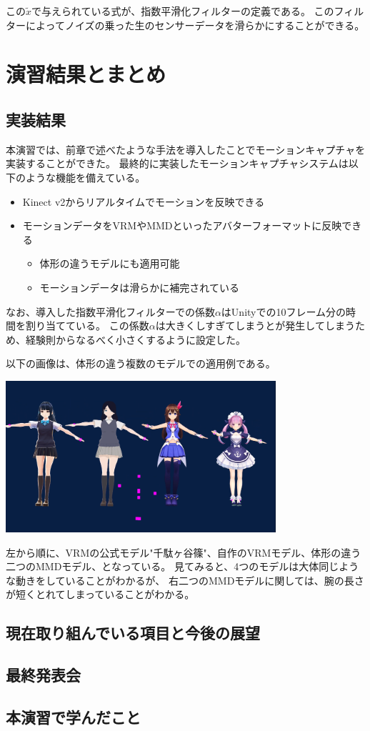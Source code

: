 \documentclass[a4j]{jsarticle}
\begin{document}
この$\tilde{x}$で与えられている式が、指数平滑化フィルターの定義である。
このフィルターによってノイズの乗った生のセンサーデータを滑らかにすることができる。

\section{演習結果とまとめ}

\subsection{実装結果}

本演習では、前章で述べたような手法を導入したことでモーションキャプチャを実装することができた。
最終的に実装したモーションキャプチャシステムは以下のような機能を備えている。

\begin{itemize}
  \item Kinect v2からリアルタイムでモーションを反映できる
  \item モーションデータをVRMやMMDといったアバターフォーマットに反映できる
  \begin{itemize}
  \item 体形の違うモデルにも適用可能
  \item モーションデータは滑らかに補完されている
  \end{itemize}
\end{itemize}

なお、導入した指数平滑化フィルターでの係数$\alpha$はUnityでの10フレーム分の時間を割り当てている。
この係数$\alpha$は大きくしすぎてしまうとが発生してしまうため、経験則からなるべく小さくするように設定した。

以下の画像は、体形の違う複数のモデルでの適用例である。

\includegraphics[width=10cm]{img/kekka.png}

左から順に、VRMの公式モデル"千駄ヶ谷篠"、自作のVRMモデル、体形の違う二つのMMDモデル、となっている。
見てみると、4つのモデルは大体同じような動きをしていることがわかるが、
右二つのMMDモデルに関しては、腕の長さが短くとれてしまっていることがわかる。

\subsection{現在取り組んでいる項目と今後の展望}

\subsection{最終発表会}

\subsection{本演習で学んだこと}
\end{document}
